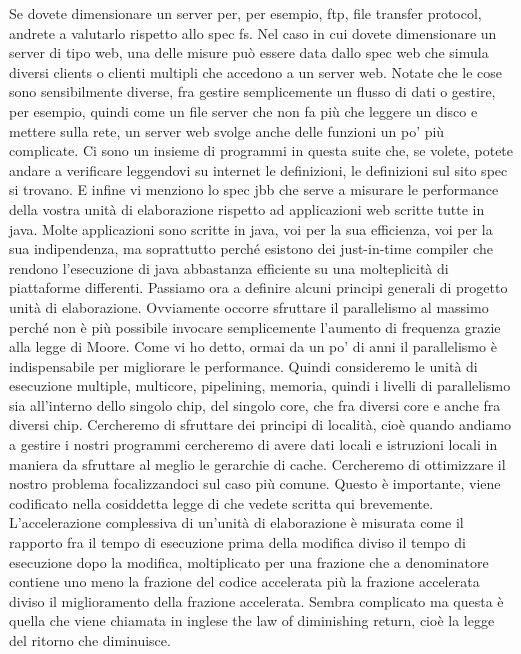 Se dovete dimensionare un server per, per esempio, ftp, file transfer protocol, andrete a valutarlo rispetto allo spec fs.
Nel caso in cui dovete dimensionare un server di tipo web, una delle misure può essere data dallo spec web che simula diversi clients o clienti multipli che accedono a un server web.
Notate che le cose sono sensibilmente diverse, fra gestire semplicemente un flusso di dati o gestire, per esempio, quindi come un file server che non fa più che leggere un disco e mettere sulla rete, un server web svolge anche delle funzioni un po' più complicate.
Ci sono un insieme di programmi in questa suite che, se volete, potete andare a verificare leggendovi su internet le definizioni, le definizioni sul sito spec si trovano.
E infine vi menziono lo spec jbb che serve a misurare le performance della vostra unità di elaborazione rispetto ad applicazioni web scritte tutte in java.
Molte applicazioni sono scritte in java, voi per la sua efficienza, voi per la sua indipendenza, ma soprattutto perché esistono dei just-in-time compiler che rendono l'esecuzione di java abbastanza efficiente su una molteplicità di piattaforme differenti.
Passiamo ora a definire alcuni principi generali di progetto unità di elaborazione.
Ovviamente occorre sfruttare il parallelismo al massimo perché non è più possibile invocare semplicemente l'aumento di frequenza grazie alla legge di Moore.
Come vi ho detto, ormai da un po' di anni il parallelismo è indispensabile per migliorare le performance.
Quindi consideremo le unità di esecuzione multiple, multicore, pipelining, memoria, quindi i livelli di parallelismo sia all'interno dello singolo chip, del singolo core, che fra diversi core e anche fra diversi chip.
Cercheremo di sfruttare dei principi di località, cioè quando andiamo a gestire i nostri programmi cercheremo di avere dati locali e istruzioni locali in maniera da sfruttare al meglio le gerarchie di cache.
Cercheremo di ottimizzare il nostro problema focalizzandoci sul caso più comune.
Questo è importante, viene codificato nella cosiddetta legge di che vedete scritta qui brevemente.
L'accelerazione complessiva di un'unità di elaborazione è misurata come il rapporto fra il tempo di esecuzione prima della modifica diviso il tempo di esecuzione dopo la modifica, moltiplicato per una frazione che a denominatore contiene uno meno la frazione del codice accelerata più la frazione accelerata diviso il miglioramento della frazione accelerata.
Sembra complicato ma questa è quella che viene chiamata in inglese the law of diminishing return, cioè la legge del ritorno che diminuisce.
